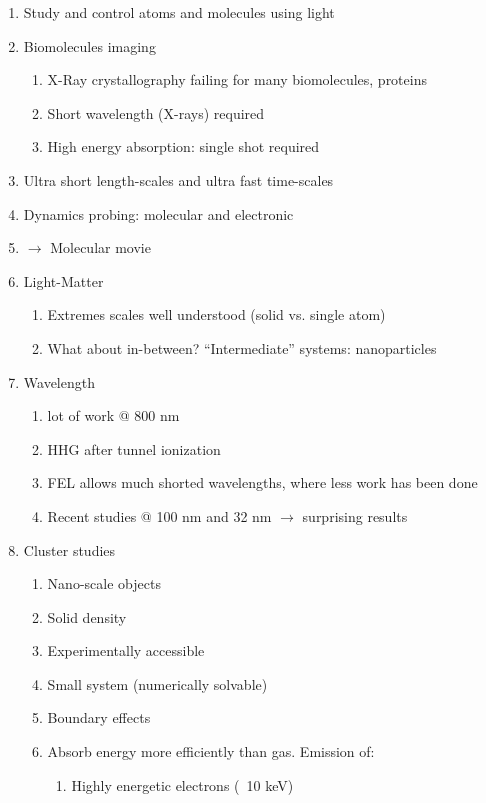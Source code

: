 \begin{enumerate}
\item Study and control atoms and molecules using light
\item Biomolecules imaging
    \begin{enumerate}
        \item X-Ray crystallography failing for many biomolecules, proteins
        \item Short wavelength (X-rays) required
        \item High energy absorption: single shot required
    \end{enumerate}
\item Ultra short length-scales and ultra fast time-scales
\item Dynamics probing: molecular and electronic
\item $\rightarrow$ Molecular movie
\item Light-Matter
    \begin{enumerate}
        \item Extremes scales well understood (solid vs. single atom)
        \item What about in-between? ``Intermediate'' systems: nanoparticles
    \end{enumerate}
\item Wavelength
    \begin{enumerate}
        \item lot of work @ 800 nm
        \item HHG after tunnel ionization
        \item FEL allows much shorted wavelengths, where less work has been done
        \item Recent studies @ 100 nm and 32 nm $\rightarrow$ surprising results
    \end{enumerate}
\item Cluster studies
    \begin{enumerate}
        \item Nano-scale objects
        \item Solid density
        \item Experimentally accessible
        \item Small system (numerically solvable)
        \item Boundary effects
        \item Absorb energy more efficiently than gas. Emission of:
        \begin{enumerate}
            \item Highly energetic electrons (~10 keV)

\end{enumerate}
\end{enumerate}
\end{enumerate}

